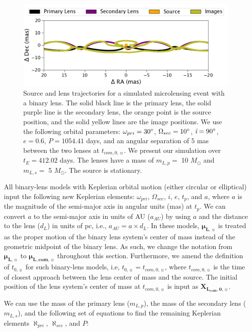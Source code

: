 \documentclass[twocolumn]{aastex701}
\newcommand{\vect}[1]{\boldsymbol{#1}}
\newcommand{\tnot}{t_{0,\sun}}
\newcommand{\mulsysvec}{\vect{\mu}_{\boldsymbol{L, com},\sun}}
\newcommand{\mulvec}{\vect{\mu}_{\boldsymbol{L},\sun}}
\newcommand{\Xlcomvec}{\vect{X}_{\boldsymbol{L_{com},0},\sun}}
\newcommand{\tcomnot}{t_{com,0,\sun}}
\newcommand{\w}{\omega_{pri}}
\newcommand{\bigomega}{\Omega_{sec}}
\newcommand{\inclination}{\textit{i}}
\newcommand{\eccentricity}{\textit{e}}
\newcommand{\period}{\textit{P}}
\newcommand{\al}{\aleph_{pri}}
\newcommand{\ala}{\aleph_{sec}}
\begin{document}
\begin{figure}
    \centering
    \includegraphics[width= .5 \textwidth] {figures/psbl_keplerian.png}
    \caption{Source and lens trajectories for a simulated microlensing event with a binary lens. The solid black line is the primary lens, the solid purple line is the secondary lens, the orange point is the source position, and the solid yellow lines are the image positions. We use the following orbital parameters: $\w = 30 \degree$, $\bigomega = 10 \degree$, $\inclination = 90 \degree$, $e=0.6$, $\period = 1054.41 $ days, and an angular separation of $5$ mas between the two lenses at $\tcomnot$. We present our simulation over $t_E=412.02$ days. The lenses have a mass of $m_{L,p}=$ 10 $M_\odot$ and $m_{L,s}=$ 5 $M_\odot$. The source is stationary.}
    \label{fig:psbl_keplerian}
\end{figure}

All binary-lens models with Keplerian orbital motion (either circular or elliptical) input the following new Keplerian elements: $\w$, $\bigomega$, $\inclination$, $\eccentricity$, $t_p$, and $a$, where $a$ is the magnitude of the semi-major axis in angular units (mas) at $t_p$. We can convert $a$ to the semi-major axis in units of AU ($a_{AU}$) by using $a$ and the distance to the lens ($d_L$) in units of pc, i.e., $a_{AU} = a \times d_L$. In these models, $\mulvec$ is treated as the proper motion of the binary lens system's center of mass instead of the geometric midpoint of the binary lens. As such, we change the notation from $\mulvec$ to $\mulsysvec$ throughout this section. Furthermore, we amend the definition of $\tnot$ for such binary-lens models, i.e, $\tnot = \tcomnot$, where $\tcomnot$ is the time of closest approach between the lens center of mass and the source. The initial position of the lens system's center of mass at $\tcomnot$ is input as $\Xlcomvec$. 


We can use the mass of the primary lens ($m_{L,p}$), the mass of the secondary lens ($m_{L,s}$), and the following set of equations to find the remaining Keplerian elements $\al$,  $\ala$, and $\period$:
\end{document}

